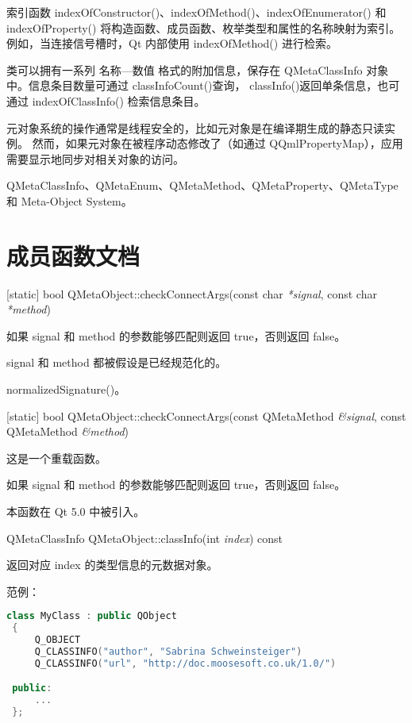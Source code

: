 索引函数 indexOfConstructor()、indexOfMethod()、indexOfEnumerator() 和 indexOfProperty() 将构造函数、成员函数、枚举类型和属性的名称映射为索引。例如，当连接信号槽时，Qt 内部使用 indexOfMethod() 进行检索。

类可以拥有一系列 名称—数值 格式的附加信息，保存在 QMetaClassInfo 对象中。信息条目数量可通过 classInfoCount()查询， classInfo()返回单条信息，也可通过 indexOfClassInfo() 检索信息条目。

\begin{notice}
元对象系统的操作通常是线程安全的，比如元对象是在编译期生成的静态只读实例。
然而，如果元对象在被程序动态修改了（如通过 QQmlPropertyMap），应用需要显示地同步对相关对象的访问。
\end{notice}

\begin{seeAlso}
QMetaClassInfo、QMetaEnum、QMetaMethod、QMetaProperty、QMetaType 和 Meta-Object System。
\end{seeAlso}

\section{成员函数文档}

[static] bool QMetaObject::checkConnectArgs(const char \emph{*signal}, const char \emph{*method})

如果 signal 和 method 的参数能够匹配则返回 true，否则返回 false。

signal 和 method 都被假设是已经规范化的。

\begin{seeAlso}
normalizedSignature()。
\end{seeAlso}

[static] bool QMetaObject::checkConnectArgs(const QMetaMethod \emph{\&signal}, const QMetaMethod \emph{\&method})

这是一个重载函数。

如果 signal 和 method 的参数能够匹配则返回 true，否则返回 false。

本函数在 Qt 5.0 中被引入。

QMetaClassInfo QMetaObject::classInfo(int \emph{index}) const

返回对应 index 的类型信息的元数据对象。

范例：

\begin{lstlisting}[language=C++]
class MyClass : public QObject
 {
     Q_OBJECT
     Q_CLASSINFO("author", "Sabrina Schweinsteiger")
     Q_CLASSINFO("url", "http://doc.moosesoft.co.uk/1.0/")

 public:
     ...
 };
\end{lstlisting}


